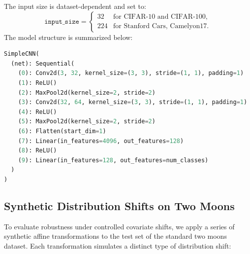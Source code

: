 \vspace{0.5em}
\noindent
The input size is dataset-dependent and set to:
\[
\texttt{input\_size} = 
\begin{cases}
32 & \text{for CIFAR-10 and CIFAR-100}, \\
224 & \text{for Stanford Cars, Camelyon17}. 
\end{cases}
\]
The model structure is summarized below:
\begin{lstlisting}[language=Python]
SimpleCNN(
  (net): Sequential(
    (0): Conv2d(3, 32, kernel_size=(3, 3), stride=(1, 1), padding=1)
    (1): ReLU()
    (2): MaxPool2d(kernel_size=2, stride=2)
    (3): Conv2d(32, 64, kernel_size=(3, 3), stride=(1, 1), padding=1)
    (4): ReLU()
    (5): MaxPool2d(kernel_size=2, stride=2)
    (6): Flatten(start_dim=1)
    (7): Linear(in_features=4096, out_features=128)
    (8): ReLU()
    (9): Linear(in_features=128, out_features=num_classes)
  )
)
\end{lstlisting}


\subsection{Synthetic Distribution Shifts on Two Moons}
\label{app:twomoons-shifts}

To evaluate robustness under controlled covariate shifts, we apply a series of synthetic affine transformations to the test set of the standard two moons dataset. Each transformation simulates a distinct type of distribution shift:


